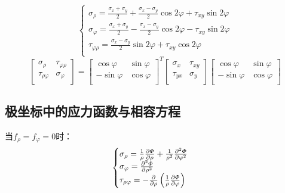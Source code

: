 \begin{equation}
\begin{cases}
\sigma _{\rho}=\frac{\sigma _x+\sigma _y}{2}+\frac{\sigma _x-\sigma _y}{2}\cos 2\varphi +\tau _{xy}\sin 2\varphi\\
\sigma _{\varphi}=\frac{\sigma _x+\sigma _y}{2}-\frac{\sigma _x-\sigma _y}{2}\cos 2\varphi -\tau _{xy}\sin 2\varphi\\
\tau _{\varphi \rho}=\frac{\sigma _x-\sigma _y}{2}\sin 2\varphi +\tau _{xy}\cos 2\varphi\\
\end{cases}
\end{equation}
\begin{equation}
\left[ \begin{matrix}
\sigma _{\rho}&		\tau _{\varphi \rho}\\
\tau _{\rho \varphi}&		\sigma _{\varphi}\\
\end{matrix} \right] =\left[ \begin{matrix}
\cos \varphi&		\sin \varphi\\
-\sin \varphi&		\cos \varphi\\
\end{matrix} \right] ^T\left[ \begin{matrix}
\sigma _x&		\tau _{xy}\\
\tau _{yx}&		\sigma _y\\
\end{matrix} \right] \left[ \begin{matrix}
\cos \varphi&		\sin \varphi\\
-\sin \varphi&		\cos \varphi\\
\end{matrix} \right]
\end{equation}
\subsection{极坐标中的应力函数与相容方程}
当$f_{\rho}=f_{\varphi}=0$时：
\begin{equation}\begin{cases}
\sigma _{\rho}=\frac{1}{\rho}\frac{\partial \varPhi}{\partial \rho}+\frac{1}{\rho ^2}\frac{\partial ^2\varPhi}{\partial \varphi ^2}\\
\sigma _{\varphi}=\frac{\partial ^2\varPhi}{\partial \rho ^2}\\
\tau _{\rho \varphi}=-\frac{\partial}{\partial \rho}\left( \frac{1}{\rho}\frac{\partial \varPhi}{\partial \varphi} \right)\\
\end{cases}
\\
\end{equation}

